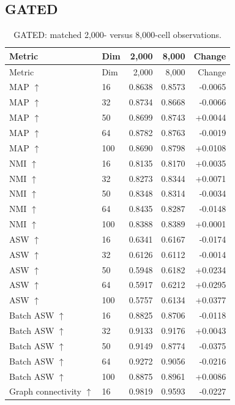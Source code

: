 \documentclass[10pt]{article}
\begin{document}
\subsection{GATED}
\begin{landscape}\begin{longtable}{@{}llrrr@{}}
\caption{GATED: matched 2,000- versus 8,000-cell observations.}\\
\toprule Metric & Dim & 2,000 & 8,000 & Change \\\midrule\endfirsthead
\toprule Metric & Dim & 2,000 & 8,000 & Change \\\midrule\endhead
MAP $\uparrow$ & 16 & 0.8638 & 0.8573 & -0.0065 \\
MAP $\uparrow$ & 32 & 0.8734 & 0.8668 & -0.0066 \\
MAP $\uparrow$ & 50 & 0.8699 & 0.8743 & +0.0044 \\
MAP $\uparrow$ & 64 & 0.8782 & 0.8763 & -0.0019 \\
MAP $\uparrow$ & 100 & 0.8690 & 0.8798 & +0.0108 \\
\addlinespace
NMI $\uparrow$ & 16 & 0.8135 & 0.8170 & +0.0035 \\
NMI $\uparrow$ & 32 & 0.8273 & 0.8344 & +0.0071 \\
NMI $\uparrow$ & 50 & 0.8348 & 0.8314 & -0.0034 \\
NMI $\uparrow$ & 64 & 0.8435 & 0.8287 & -0.0148 \\
NMI $\uparrow$ & 100 & 0.8388 & 0.8389 & +0.0001 \\
\addlinespace
ASW $\uparrow$ & 16 & 0.6341 & 0.6167 & -0.0174 \\
ASW $\uparrow$ & 32 & 0.6126 & 0.6112 & -0.0014 \\
ASW $\uparrow$ & 50 & 0.5948 & 0.6182 & +0.0234 \\
ASW $\uparrow$ & 64 & 0.5917 & 0.6212 & +0.0295 \\
ASW $\uparrow$ & 100 & 0.5757 & 0.6134 & +0.0377 \\
\addlinespace
Batch ASW $\uparrow$ & 16 & 0.8825 & 0.8706 & -0.0118 \\
Batch ASW $\uparrow$ & 32 & 0.9133 & 0.9176 & +0.0043 \\
Batch ASW $\uparrow$ & 50 & 0.9149 & 0.8774 & -0.0375 \\
Batch ASW $\uparrow$ & 64 & 0.9272 & 0.9056 & -0.0216 \\
Batch ASW $\uparrow$ & 100 & 0.8875 & 0.8961 & +0.0086 \\
\addlinespace
Graph connectivity $\uparrow$ & 16 & 0.9819 & 0.9593 & -0.0227 \\

\end{longtable}
\end{landscape}
\end{document}
